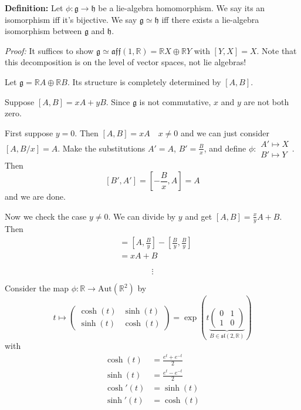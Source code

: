 \documentclass[12pt]{article}
\newcommand{\R}{\mathbb{R}}
\newcommand{\g}{\mathfrak{g}}
\newcommand{\h}{\mathfrak{h}}
\newcommand{\slf}{\mathfrak{sl}}
\newenvironment*{tbox}[2][gray]{
    \begin{tcolorbox}[
        parbox=false,
        colback=#1!5!white,
        colframe=#1!75!black,
        breakable,
        title={#2}
    ]}
    {\end{tcolorbox}}
\begin{document}
    \textbf{Definition:} Let $\phi: \g \to \h$ be a lie-algebra homomorphism. We say its an isomorphism iff it's bijective. We say $\g \simeq \h$ iff there exists a lie-algebra isomorphism between $\g$ and $\h$.

    \begin{tbox}{\textbf{Claim:} Let $\g$ and $\h$ be non-commutative, 2-dimensional lie-algebras. Then $\g \simeq \h$.}
        \emph{Proof:} It suffices to show $\g \simeq \mathfrak{aff}(1, \R) = \R X \oplus \R Y$ with $[Y, X] = X$. Note that this decomposition is on the level of vector spaces, not lie algebras!

        Let $\g = \R A \oplus \R B$. Its structure is completely determined by $[A, B]$. 
        
        Suppose $[A, B] = xA + yB$. Since $\g$ is not commutative, $x$ and $y$ are not both zero. 
        
        First suppose $y = 0$. Then $[A, B] = xA \quad x \neq 0$ and we can just consider $[A, B/x] = A$. Make the substitutions $A' = A$, $B' = \frac{B}{x}$, and define $\phi: \begin{array}{c}  A' \mapsto X\\ B' \mapsto Y\end{array}$. Then 
        \[[B', A'] = [-\frac{B}{x}, A] = A\]
        and we are done. 
        
        Now we check the case $y \neq 0$. We can divide by $y$ and get $[A, B] = \frac{x}{y} A + B$. Then 
        \begin{align*}
            [A - \frac{B}{y}, \frac{B}{y}] &= [A, \frac{B}{y}] - [\frac{B}{y}, \frac{B}{y}]\\
            &= xA + B
        \end{align*}

        \[\vdots\]
    \end{tbox}

    Consider the map $\phi: \R \to \text{Aut}(\R^2)$ by 
    \[t \mapsto \begin{pmatrix}
        \cosh(t) & \sinh(t)\\ 
        \sinh(t) & \cosh(t)
    \end{pmatrix} = \exp(t \underbrace{\begin{pmatrix}
        0 & 1\\ 
        1 & 0
    \end{pmatrix}}_{B \in \slf(2, \R)})\] 
    with 
    \begin{align*}
        \cosh(t) &= \frac{e^t + e^{-t}}{2}\\ 
        \sinh(t) &= \frac{e^t - e^{-t}}{2}\\ 
        \cosh'(t) &= \sinh(t)\\ 
        \sinh'(t) &= \cosh(t)
    \end{align*}
\end{document}
